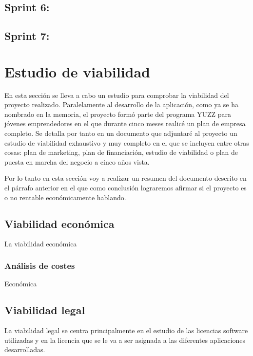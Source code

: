 \subsection{Sprint 6: }\label{sprint6}

\subsection{Sprint 7: }\label{sprint6}


\section{Estudio de viabilidad}\label{estudio-viabilidad}
En esta sección se lleva a cabo un estudio para comprobar la viabilidad del proyecto realizado. Paralelamente al desarrollo de la aplicación, como ya se ha nombrado en la memoria, el proyecto formó parte del programa YUZZ para jóvenes emprendedores en el que durante cinco meses realicé un plan de empresa completo. Se detalla por tanto en un documento que adjuntaré al proyecto un estudio de viabilidad exhaustivo  y muy completo en el que se incluyen entre otras cosas: plan de marketing, plan de financiación, estudio de viabilidad o plan de puesta en marcha del negocio a cinco años vista. 

Por lo tanto en esta sección voy a realizar un resumen del documento descrito en el párrafo anterior en el que como conclusión lograremos afirmar si el proyecto es o no rentable económicamente hablando.

\subsection{Viabilidad económica}\label{viabilidad-economica}

La viabilidad económica 

\subsubsection{Análisis de costes}\label{costes}
Económica

\subsection{Viabilidad legal}\label{viabilidad-legal}
La viabilidad legal se centra principalmente en el estudio de las licencias software utilizadas y en la licencia que se le va a ser asignada a las diferentes aplicaciones desarrolladas.



